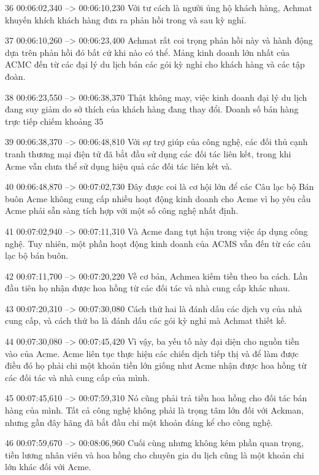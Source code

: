 36
00:06:02,340 --> 00:06:10,230
Với tư cách là người ủng hộ khách hàng, Achmat khuyến khích khách hàng đưa ra phản hồi trong và sau kỳ nghỉ.

37
00:06:10,260 --> 00:06:23,400
Achmat rất coi trọng phản hồi này và hành động dựa trên phản hồi đó bất cứ khi nào có thể.  Mảng kinh doanh lớn nhất của ACMC đến từ các đại lý du lịch bán các gói kỳ nghỉ cho khách hàng và các tập đoàn.

38
00:06:23,550 --> 00:06:38,370
Thật không may, việc kinh doanh đại lý du lịch đang suy giảm do sở thích của khách hàng đang thay đổi.  Doanh số bán hàng trực tiếp chiếm khoảng 35%

39
00:06:38,370 --> 00:06:48,810
Với sự trợ giúp của công nghệ, các đối thủ cạnh tranh thương mại điện tử đã bắt đầu sử dụng các đối tác liên kết, trong khi Acme vẫn chưa thể sử dụng hiệu quả các đối tác liên kết và.

40
00:06:48,870 --> 00:07:02,730
Đây được coi là cơ hội lớn để các Câu lạc bộ Bán buôn Acme không cung cấp nhiều hoạt động kinh doanh cho Acme vì họ yêu cầu Acme phải sẵn sàng tích hợp với một số công nghệ nhất định.

41
00:07:02,940 --> 00:07:11,310
Và Acme đang tụt hậu trong việc áp dụng công nghệ.  Tuy nhiên, một phần hoạt động kinh doanh của ACMS vẫn đến từ các câu lạc bộ bán buôn.

42
00:07:11,700 --> 00:07:20,220
Về cơ bản, Achmea kiếm tiền theo ba cách.  Lần đầu tiên họ nhận được hoa hồng từ các đối tác và nhà cung cấp khác nhau.

43
00:07:20,310 --> 00:07:30,080
Cách thứ hai là đánh dấu các dịch vụ của nhà cung cấp, và cách thứ ba là đánh dấu các gói kỳ nghỉ mà Achmat thiết kế.

44
00:07:30,080 --> 00:07:45,420
Vì vậy, ba yếu tố này đại diện cho nguồn tiền vào của Acme.  Acme liên tục thực hiện các chiến dịch tiếp thị và để làm được điều đó họ phải chi một khoản tiền lớn giống như Acme nhận được hoa hồng từ các đối tác và nhà cung cấp của mình.

45
00:07:45,610 --> 00:07:59,310
Nó cũng phải trả tiền hoa hồng cho đối tác bán hàng của mình.  Tất cả công nghệ không phải là trọng tâm lớn đối với Ackman, nhưng gần đây hãng đã bắt đầu chi một khoản đáng kể cho công nghệ.

46
00:07:59,670 --> 00:08:06,960
Cuối cùng nhưng không kém phần quan trọng, tiền lương nhân viên và hoa hồng cho chuyên gia du lịch cũng là một khoản chi lớn khác đối với Acme.

